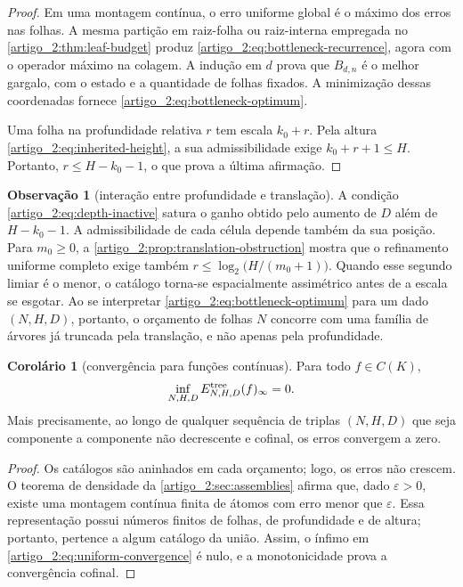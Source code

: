 \documentclass[12pt,a4paper]{article}
\theoremstyle{preciso}
\theoremstyle{definition}
\theoremstyle{preciso}
\theoremstyle{preciso}
\theoremstyle{preciso}
\theoremstyle{preciso}
\newtheorem{corollary}[teorema]{Corolário}
\theoremstyle{definition}
\theoremstyle{preciso}
\theoremstyle{definition}
\newtheorem{remark}[teorema]{Observação}
\theoremstyle{preciso}
\theoremstyle{preciso}
\theoremstyle{definition}
\begin{document}
\begin{proof}
Em uma montagem contínua, o erro uniforme global é o máximo dos erros nas
folhas. A mesma partição em raiz-folha ou raiz-interna empregada no
\cref{artigo_2:thm:leaf-budget} produz
\eqref{artigo_2:eq:bottleneck-recurrence}, agora com o operador máximo na colagem.
A indução em $d$ prova que $B_{d,n}$ é o melhor gargalo, com o estado e a
quantidade de folhas fixados. A minimização dessas coordenadas fornece
\eqref{artigo_2:eq:bottleneck-optimum}.

Uma folha na profundidade relativa $r$ tem escala $k_0+r$. Pela altura
\eqref{artigo_2:eq:inherited-height}, a sua admissibilidade exige
$k_0+r+1\le H$. Portanto, $r\le H-k_0-1$, o que prova a última afirmação.
\end{proof}

\begin{remark}[interação entre profundidade e translação]\label{map:artigo_2:8.3}
\label{artigo_2:rem:depth-vs-translation}
A condição \eqref{artigo_2:eq:depth-inactive} satura o ganho obtido pelo aumento de $D$
além de $H-k_0-1$. A admissibilidade de cada célula depende também da sua
posição.
Para $m_0\ge0$, a \cref{artigo_2:prop:translation-obstruction} mostra que o refinamento
uniforme completo exige também
$r\le\log_2\bigl(H/(m_0+1)\bigr)$. Quando esse segundo limiar é o menor, o
catálogo torna-se espacialmente assimétrico antes de a escala se esgotar. Ao se interpretar
\eqref{artigo_2:eq:bottleneck-optimum} para um dado $(N,H,D)$, portanto, o orçamento de
folhas $N$ concorre com uma família de árvores já truncada pela
translação, e não apenas pela profundidade.
\end{remark}

\begin{corollary}[convergência para funções contínuas]\label{map:artigo_2:8.4}
\label{artigo_2:cor:uniform-convergence}
Para todo $f\in C(K)$,
\begin{equation}
 \inf_{N,H,D}E_{N,H,D}^{\rm tree}(f)_\infty=0.
 \label{artigo_2:eq:uniform-convergence}
\end{equation}
Mais precisamente, ao longo de qualquer sequência de triplas $(N,H,D)$ que
seja componente a componente não decrescente e cofinal, os erros convergem a
zero.
\end{corollary}

\begin{proof}
Os catálogos são aninhados em cada orçamento; logo, os erros não crescem. O
teorema de densidade da \cref{artigo_2:sec:assemblies} afirma que, dado $\varepsilon>0$,
existe uma montagem contínua finita de átomos com erro menor que
$\varepsilon$. Essa representação possui números finitos de folhas,
de profundidade e de altura; portanto, pertence a algum catálogo da união. Assim, o
ínfimo em \eqref{artigo_2:eq:uniform-convergence} é nulo, e a monotonicidade prova a
convergência cofinal.
\end{proof}
\end{document}
